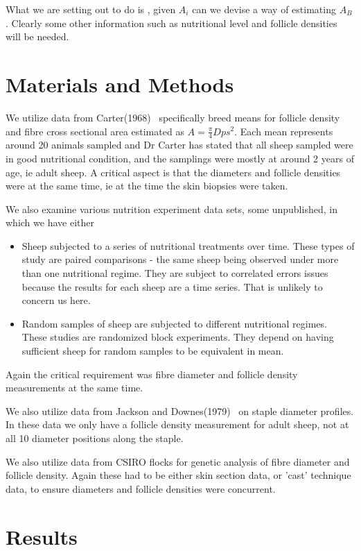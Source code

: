 \documentclass[titlepage]{article}  %
\begin{document}
What we are setting out to do  is , given $A_{i}$ can we devise a way of estimating $A_{B}$. Clearly some other information such as nutritional level and follicle densities will be needed. 


\clearpage
\section{Materials and Methods}
We utilize data from Carter(1968)~\cite{cart:68} specifically breed means for follicle density and fibre cross sectional area estimated as $A = \frac{\pi}{4}Dps^{2}$. Each mean represents around 20 animals sampled and Dr Carter has stated that all sheep sampled were in good nutritional condition,  and the samplings were mostly at around 2 years of age, ie adult sheep.  A critical aspect is that the diameters and follicle densities were at the same time, ie at the time the skin biopsies were taken.

We also examine various nutrition experiment data sets, some unpublished, in which we have either
\begin{itemize}
\item Sheep subjected to a series of nutritional treatments over time. These types of study are paired comparisons - the same sheep being observed under more than one nutritional regime. They are subject to correlated errors issues because the results for each sheep are a time series. That is unlikely to concern us here.
\item Random samples of sheep are subjected to different nutritional regimes. These studies are randomized block experiments. They depend on having sufficient sheep for random samples to be equivalent in mean.
\end{itemize}
Again the critical requirement was fibre diameter and follicle density measurements at the same time.
 
We also utilize data from Jackson and Downes(1979)~\cite{jack:79} on staple diameter profiles. In these data we only have a follicle density measurement for adult sheep, not at all 10 diameter positions along the staple.

We also utilize data from CSIRO flocks for genetic analysis of fibre diameter and follicle density. Again these had to be either skin section data, or 'cast' technique data, to ensure diameters and follicle densities were concurrent.
\clearpage
\section{Results}
\end{document}
